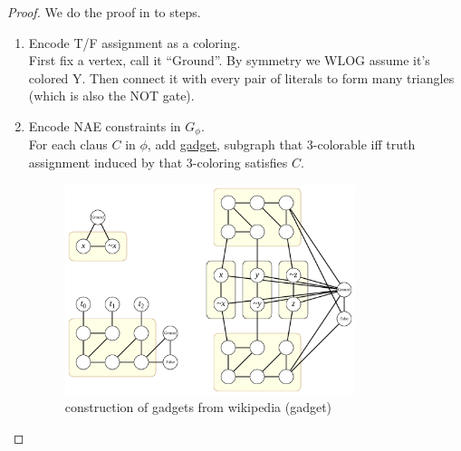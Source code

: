 \documentclass{article}
\begin{document}
\begin{proof}
  We do the proof in to steps.

  \begin{enumerate}
    \item Encode T/F assignment as a coloring. \\
    First fix a vertex, call it ``Ground''. By symmetry we WLOG assume it's colored Y. Then connect it with every pair of literals to form many triangles (which is also the NOT gate).


    \item Encode NAE constraints in \(G_{\phi}\). \\
    For each claus \(C\) in \(\phi\), add \ul{gadget}, subgraph that 3-colorable iff truth assignment induced by that 3-coloring satisfies \(C\).

    \begin{figure}[h]
      \centering
      \includegraphics[width=0.8\textwidth]{assets/3SAT-3COL_reduction.pdf}
      \caption{construction of gadgets from wikipedia (gadget)}
    \end{figure}
  \end{enumerate}
\end{proof}
\end{document}
